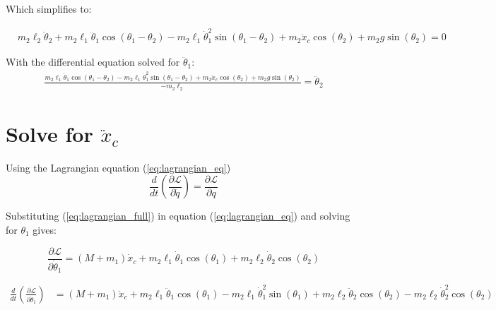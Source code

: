 \documentclass[10pt]{article}
\begin{document}
    Which simplifies to:

    \begin{equation}
        \begin{aligned}
            &m_2\ell_2 \ddot \theta_2 + m_2 \ell_1  \ddot \theta_1 \cos(\theta_1 - \theta_2) - m_2 \ell_1\dot \theta_1^2 \sin(\theta_1 - \theta_2)+ m_2 \ddot x_c  \cos(\theta_2) +m_2g\sin(\theta_2) =0
        \end{aligned}
    \end{equation}  

    With the differential equation solved for $\ddot \theta_1$:
    \begin{equation}
        \begin{aligned}
            \frac{m_2 \ell_1  \ddot \theta_1 \cos(\theta_1 - \theta_2) - m_2 \ell_1\dot \theta_1^2 \sin(\theta_1 - \theta_2)+ m_2 \ddot x_c  \cos(\theta_2) +m_2g\sin(\theta_2)}{-m_2 \ell_2} = \ddot \theta_2
        \end{aligned}
    \end{equation}  



    \pagebreak
    \section{Solve for $\ddot x_c$}
    Using the Lagrangian equation (\ref{eq:lagrangian_eq})
    \begin{equation} \label{eq:lagrangian_eq}
        \frac{d}{dt} \left(\frac{\partial \mathcal{L}}{\partial \dot q} \right) = 
        \frac{\partial \mathcal{L}}{\partial q}
    \end{equation}

    Substituting (\ref{eq:lagrangian_full}) in equation (\ref{eq:lagrangian_eq}) and solving for $\theta_1$ gives:

    \begin{equation} \label{eq: lagrange Step1}
        \frac{\partial \mathcal{L}}{\partial \dot\theta_1} = (M + m_1)\dot x_c + m_2\ell_1\dot\theta_1\cos(\theta_1) + m_2\ell_2\dot\theta_2\cos(\theta_2)
    \end{equation}

    \begin{equation} \label{eq: lagrange Step2}
        \begin{aligned}
        \frac{d}{dt} \left(\frac{\partial \mathcal{L}}{\partial \dot\theta_1}\right) &= (M + m_1)\ddot x_c + m_2\ell_1\ddot\theta_1\cos(\theta_1) - m_2\ell_1\dot\theta_1^2\sin(\theta_1) + m_2\ell_2\ddot\theta_2\cos(\theta_2) - m_2\ell_2\dot\theta_2^2\cos(\theta_2)
        \end{aligned}
    \end{equation}
\end{document}
